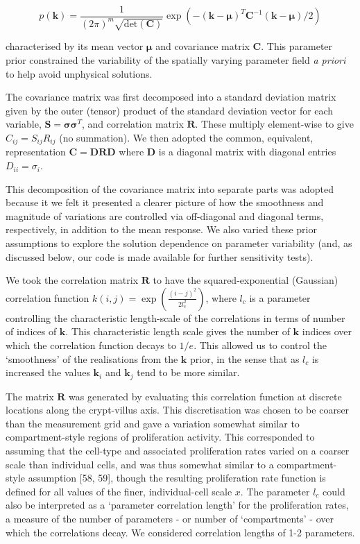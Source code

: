 \documentclass[10pt,letterpaper]{article}
\begin{document}
\begin{equation}p(\mathbf{k}) = \frac{1}{(2\pi)^m\sqrt{\mbox{det}(\mathbf{C})}}\exp(-(\mathbf{k}-\symbf{\mu})^T\mathbf{C}^{-1}(\mathbf{k}-\symbf{\mu})/2)\label{eq:prior}\end{equation}

characterised by its mean vector \(\symbf{\mu}\) and covariance matrix
\(\mathbf{C}\). This parameter prior constrained the variability of the
spatially varying parameter field \emph{a priori} to help avoid
unphysical solutions.

The covariance matrix was first decomposed into a standard deviation
matrix given by the outer (tensor) product of the standard deviation
vector for each variable,
\(\mathbf{S} = \symbf{\sigma}\symbf{\sigma}^T\), and correlation matrix
\(\mathbf{R}\). These multiply element-wise to give
\(C_{ij} = S_{ij}R_{ij}\) (no summation). We then adopted the common,
equivalent, representation
\(\mathbf{C} = \mathbf{D}\mathbf{R}\mathbf{D}\) where \(\mathbf{D}\) is
a diagonal matrix with diagonal entries \(D_{ii} = \sigma_i\).

This decomposition of the covariance matrix into separate parts was
adopted because it we felt it presented a clearer picture of how the
smoothness and magnitude of variations are controlled via off-diagonal
and diagonal terms, respectively, in addition to the mean response. We
also varied these prior assumptions to explore the solution dependence
on parameter variability (and, as discussed below, our code is made
available for further sensitivity tests).

We took the correlation matrix \(\mathbf{R}\) to have the
squared-exponential (Gaussian) correlation function
\(k(i,j) = \exp(\frac{(i-j)^2}{2l_c^2})\), where \(l_c\) is a parameter
controlling the characteristic length-scale of the correlations in terms
of number of indices of \(\mathbf{k}\). This characteristic length scale
gives the number of \(\mathbf{k}\) indices over which the correlation
function decays to \(1/e\). This allowed us to control the `smoothness'
of the realisations from the \(\mathbf{k}\) prior, in the sense that as
\(l_c\) is increased the values \(\mathbf{k}_i\) and \(\mathbf{k}_j\)
tend to be more similar.

The matrix \(\mathbf{R}\) was generated by evaluating this correlation
function at discrete locations along the crypt-villus axis. This
discretisation was chosen to be coarser than the measurement grid and
gave a variation somewhat similar to compartment-style regions of
proliferation activity. This corresponded to assuming that the cell-type
and associated proliferation rates varied on a coarser scale than
individual cells, and was thus somewhat similar to a compartment-style
assumption {[}58, 59{]}, though the resulting proliferation rate
function is defined for all values of the finer, individual-cell scale
\(x\). The parameter \(l_c\) could also be interpreted as a `parameter
correlation length' for the proliferation rates, a measure of the number
of parameters - or number of `compartments' - over which the
correlations decay. We considered correlation lengths of 1-2 parameters.
\end{document}
